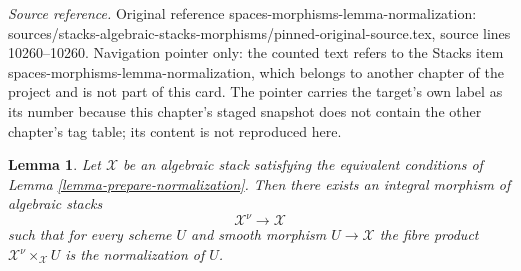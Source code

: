 \documentclass[10pt,a4paper]{amsart}
\theoremstyle{plain}
\newtheorem{lemma}[subsection]{Lemma}
\theoremstyle{definition}
\theoremstyle{remark}
\numberwithin{equation}{subsection}
\begin{document}
\noindent\textit{Source reference.} Original reference spaces-morphisms-lemma-normalization: sources/stacks-algebraic-stacks-morphisms/pinned-original-source.tex, source lines 10260--10260. Navigation pointer only: the counted text refers to the Stacks item spaces-morphisms-lemma-normalization, which belongs to another chapter of the project and is not part of this card. The pointer carries the target's own label as its number because this chapter's staged snapshot does not contain the other chapter's tag table; its content is not reproduced here.\par\medskip
\begin{lemma}
\label{lemma-normalization}
Let $\mathcal{X}$ be an algebraic stack satisfying
the equivalent conditions of Lemma \ref{lemma-prepare-normalization}.
Then there exists an integral morphism of algebraic stacks
$$
\mathcal{X}^\nu \longrightarrow \mathcal{X}
$$
such that for every scheme $U$ and smooth morphism $U \to \mathcal{X}$
the fibre product $\mathcal{X}^\nu \times_\mathcal{X} U$
is the normalization of $U$.
\end{lemma}
\end{document}
